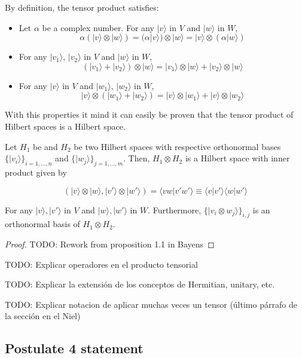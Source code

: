 By definition, the tensor product satisfies:

\begin{itemize}
	\item Let $\alpha$ be a complex number. For any $|v\rangle$ in $V$ and $|w\rangle$ in $W$,
	$$ \alpha(|v\rangle \otimes |w\rangle) = (\alpha|v\rangle) \otimes |w\rangle = |v\rangle \otimes (\alpha|w\rangle) $$
	
	\item For any $|v_1\rangle$, $|v_2\rangle$ in $V$ and $|w\rangle$ in $W$,
	$$ (|v_1\rangle + |v_2\rangle) \otimes |w\rangle = |v_1\rangle \otimes |w\rangle + |v_2\rangle \otimes |w\rangle $$
	
	\item For any $|v\rangle$ in $V$ and $|w_1\rangle$, $|w_2\rangle$ in $W$,
	$$ |v\rangle \otimes (|w_1\rangle + |w_2\rangle) = |v\rangle \otimes |w_1\rangle + |v\rangle \otimes |w_2\rangle $$
\end{itemize}

With this properties it mind it can easily be proven that the tensor product of Hilbert spaces is a Hilbert space.

\begin{proposition}
	Let $H_1$ be and $H_2$ be two Hilbert spaces with respective orthonormal bases $\{|v_i\rangle\}_{i=1,\dots,n}$ and $\{|w_j\rangle\}_{j=1,\dots,m}$. Then, $H_1 \otimes H_2$ is a Hilbert space with inner product given by
	
	$$ ( |v\rangle \otimes |w\rangle, |v'\rangle \otimes |w'\rangle) = \langle vw|v'w'\rangle \equiv \langle v|v'\rangle\langle w|w'\rangle $$
	
	For any $|v\rangle, |v'\rangle$ in $V$ and $|w\rangle, |w'\rangle$ in $W$. Furthermore, $\{|v_i \otimes w_j\rangle\}_{i,j}$ is an orthonormal basis of $H_1 \otimes H_2$.
\end{proposition}

\begin{proof}
	TODO: Rework from proposition 1.1 in Bayens 
\end{proof}


TODO: Explicar operadores en el producto tensorial

TODO: Explicar la extensión de los conceptos de Hermitian, unitary, etc.

TODO: Explicar notacion de aplicar muchas veces un tensor (último párrafo de la sección en el Niel)


\subsection{Postulate 4 statement}




